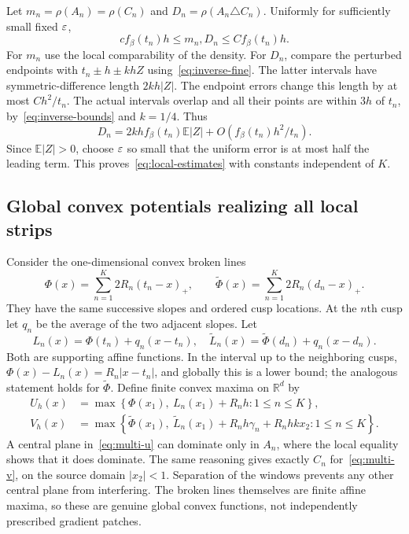 \documentclass[11pt]{article}
\theoremstyle{remark}\newtheorem{remark}[theorem]{Remark}
\newcommand{\R}{\mathbb R}\newcommand{\E}{\mathbb E}
\begin{document}
Let $m_n=\rho(A_n)=\rho(C_n)$ and $D_n=\rho(A_n\triangle C_n)$. Uniformly for sufficiently small fixed $\varepsilon$,
\begin{equation}\label{eq:local-estimates}
 c f_\beta(t_n)h\le m_n,D_n\le C f_\beta(t_n)h.
\end{equation}
For $m_n$ use the local comparability of the density. For $D_n$, compare the perturbed endpoints with $t_n\pm h\pm khZ$ using~\eqref{eq:inverse-fine}. The latter intervals have symmetric-difference length $2kh|Z|$. The endpoint errors change this length by at most $C h^2/t_n$. The actual intervals overlap and all their points are within $3h$ of $t_n$, by~\eqref{eq:inverse-bounds} and $k=1/4$. Thus
\[
 D_n=2kh f_\beta(t_n)\E|Z|+O(f_\beta(t_n)h^2/t_n).
\]
Since $\E|Z|>0$, choose $\varepsilon$ so small that the uniform error is at most half the leading term. This proves~\eqref{eq:local-estimates} with constants independent of $K$.

\subsection{Global convex potentials realizing all local strips}
Consider the one-dimensional convex broken lines
\[
 \Phi(x)=\sum_{n=1}^K2R_n(t_n-x)_+,\qquad
 \widetilde\Phi(x)=\sum_{n=1}^K2R_n(d_n-x)_+.
\]
They have the same successive slopes and ordered cusp locations. At the $n$th cusp let $q_n$ be the average of the two adjacent slopes. Let
\[
 L_n(x)=\Phi(t_n)+q_n(x-t_n),\quad
 \widetilde L_n(x)=\widetilde\Phi(d_n)+q_n(x-d_n).
\]
Both are supporting affine functions. In the interval up to the neighboring cusps,
$\Phi(x)-L_n(x)=R_n|x-t_n|$, and globally this is a lower bound; the analogous statement holds for $\widetilde\Phi$.
Define finite convex maxima on $\R^d$ by
\begin{align}
 U_h(x)&=\max\left\{\Phi(x_1),\ L_n(x_1)+R_nh:1\le n\le K\right\},\label{eq:multi-u}\\
 V_h(x)&=\max\left\{\widetilde\Phi(x_1),\
 \widetilde L_n(x_1)+R_nh\gamma_n+R_nhk x_2:1\le n\le K\right\}.
 \label{eq:multi-v}
\end{align}
A central plane in~\eqref{eq:multi-u} can dominate only in $A_n$, where the local equality shows that it does dominate. The same reasoning gives exactly $C_n$ for~\eqref{eq:multi-v}, on the source domain $|x_2|<1$. Separation of the windows prevents any other central plane from interfering. The broken lines themselves are finite affine maxima, so these are genuine global convex functions, not independently prescribed gradient patches.
\end{document}
